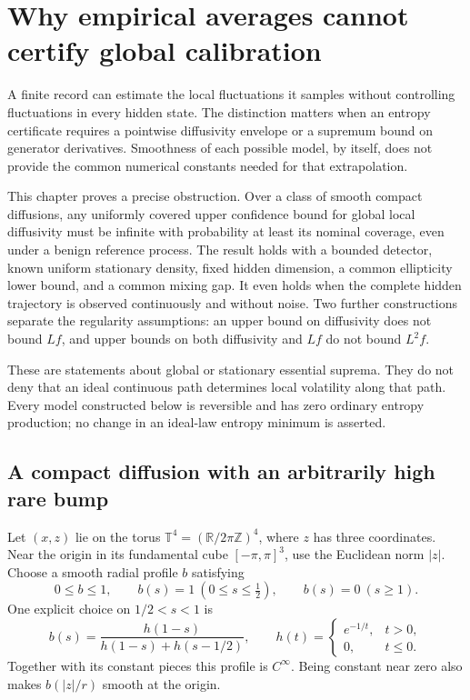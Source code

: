 \chapter[Limits of empirical calibration]{Why empirical averages cannot certify global calibration}
\label{ch:dc-calibration-limits}

A finite record can estimate the local fluctuations it samples without
controlling fluctuations in every hidden state. The distinction matters
when an entropy certificate requires a pointwise diffusivity envelope or
a supremum bound on generator derivatives. Smoothness of each possible
model, by itself, does not provide the common numerical constants needed
for that extrapolation.

This chapter proves a precise obstruction. Over a class of smooth compact
diffusions, any uniformly covered upper confidence bound for global local
diffusivity must be infinite with probability at least its nominal coverage,
even under a benign reference process. The result holds with a bounded
detector, known uniform stationary density, fixed hidden dimension, a common
ellipticity lower bound, and a common mixing gap. It even holds when the
complete hidden trajectory is observed continuously and without noise.
Two further constructions separate the regularity assumptions: an upper
bound on diffusivity does not bound $Lf$, and upper bounds on both
diffusivity and $Lf$ do not bound $L^2f$.

These are statements about global or stationary essential suprema.
They do not deny that an ideal continuous path determines local volatility
along that path. Every model constructed below is reversible and has zero
ordinary entropy production; no change in an ideal-law entropy minimum
is asserted.

\section{A compact diffusion with an arbitrarily high rare bump}

Let $(x,z)$ lie on the torus $\mathbb T^4=(\mathbb R/2\pi\mathbb Z)^4$,
where $z$ has three coordinates. Near the origin in its fundamental cube
$[-\pi,\pi]^3$, use the Euclidean norm $|z|$. Choose a smooth radial profile
$b$ satisfying
\[
 0\leq b\leq1,\qquad b(s)=1\ (0\leq s\leq\tfrac12),\qquad
 b(s)=0\ (s\geq1).
\]
One explicit choice on $1/2<s<1$ is
\begin{equation}
 b(s)=\frac{h(1-s)}{h(1-s)+h(s-1/2)},\qquad
 h(t)=\begin{cases}e^{-1/t},&t>0,\\0,&t\leq0.\end{cases}
 \label{eq:dc-bump-profile}
\end{equation}
Together with its constant pieces this profile is $C^\infty$. Being
constant near zero also makes $b(|z|/r)$ smooth at the origin.


